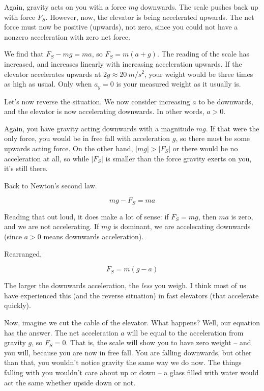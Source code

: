 \documentclass[12pt,a4paper]{report}
\begin{document}
Again, gravity acts on you with a force $m g$ downwards. The scale pushes back up with force $F_S$. However, now, the elevator is being accelerated upwards. The net force must now be positive (upwards), not zero, since you could not have a nonzero acceleration with zero net force.

We find that $F_S - m g = m a$, so $F_S = m(a + g)$. The reading of the scale has increased, and increases linearly with increasing acceleration upwards. If the elevator accelerates upwards at $2g \approx \SI{20}{m/s^2}$, your weight would be three times as high as usual. Only when $a_y = 0$ is your measured weight as it usually is.

Let's now reverse the situation. We now consider increasing $a$ to be downwards, and the elevator is now accelerating downwards. In other words, $a > 0$.

Again, you have gravity acting downwards with a magnitude $m g$. If that were the only force, you would be in free fall with acceleration $g$, so there must be some upwards acting force. On the other hand, $|m g| > |F_S|$ or there would be no acceleration at all, so while $|F_S|$ is smaller than the force gravity exerts on you, it's still there.

Back to Newton's second law.

\begin{equation}
m g - F_S = m a
\end{equation}

Reading that out loud, it does make a lot of sense: if $F_S = m g$, then $m a$ is zero, and we are not accelerating. If $m g$ is dominant, we are accelecating downwards (since $a > 0$ means downwards acceleration).

Rearranged,

\begin{equation}
F_S = m(g - a)
\end{equation}

The larger the downwards acceleration, the \emph{less} you weigh. I think most of us have experienced this (and the reverse situation) in fast elevators (that accelerate quickly).

Now, imagine we cut the cable of the elevator. What happens? Well, our equation has the answer. The net acceleration $a$ will be equal to the acceleration from gravity $g$, so $F_S = 0$. That is, the scale will show you to have zero weight -- and you will, because you are now in free fall. You are falling downwards, but other than that, you wouldn't notice gravity the same way we do now. The things falling with you wouldn't care about up or down -- a glass filled with water would act the same whether upside down or not.
\end{document}
